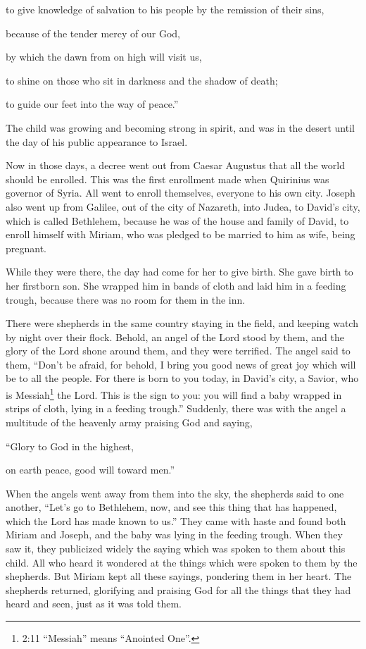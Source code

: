 \myverse{}to give knowledge of salvation to his people by the
remission of their sins,

\myverse{}because of the tender mercy of our God,

by which the dawn from on high will visit us,

\myverse{}to shine on those who sit in darkness and the shadow
of death;

to guide our feet into the way of peace.”

\myverse{}The child was growing and becoming strong in spirit, and was
in the desert until the day of his public appearance to Israel.


\mychapter{} \myverse*{}Now in those days, a decree went out from Caesar Augustus that
all the world should be enrolled.
\myverse{}This was the first enrollment made when Quirinius was governor of Syria.
\myverse{}All went to enroll themselves, everyone to his own city.
\myverse{}Joseph also went up from Galilee, out of the city of Nazareth, into Judea, to
David’s city, which is called Bethlehem, because he was of the house and family of David,
\myverse{}to enroll himself with Miriam, who was pledged to be married to him as wife,
being pregnant.

\myverse{}While they were there, the day had come for her to give birth.
\myverse{}She gave birth to her firstborn son. She wrapped him in bands of cloth and laid
him in a feeding trough, because there was no room for them in the inn.

\myverse{}There were shepherds in the same country staying in the field,
and keeping watch by night over their flock.
\myverse{}Behold, an angel of the Lord stood by them, and the glory of the Lord shone
around them, and they were terrified.
\myverse{}The angel said to them, “Don’t be afraid, for behold, I bring you good news
of great joy which will be to all the people.
\myverse{}For there is born to you today, in David’s city, a Savior, who is Messiah\footnote{2:11 “Messiah” means “Anointed One”.} the Lord.
\myverse{}This is the sign to you: you will find a baby wrapped in strips of cloth,
lying in a feeding trough.”
\myverse{}Suddenly, there was with the angel a multitude of the heavenly army praising
God and saying,

\myverse{}“Glory to God in the highest,

on earth peace, good will toward men.”

\myverse{}When the angels went away from them into the sky, the shepherds
said to one another, “Let’s go to Bethlehem, now, and see this thing that has happened, which the Lord
has made known to us.”
\myverse{}They came with haste and found both Miriam and Joseph, and the baby was lying
in the feeding trough.
\myverse{}When they saw it, they publicized widely the saying which was spoken to them
about this child.
\myverse{}All who heard it wondered at the things which were spoken to them by the shepherds.
\myverse{}But Miriam kept all these sayings, pondering them in her heart.
\myverse{}The shepherds returned, glorifying and praising God for all the things that
they had heard and seen, just as it was told them.

